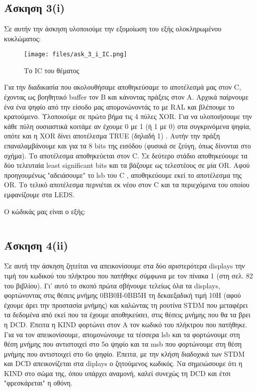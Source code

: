 \documentclass[a4paper,10pt]{article} \usepackage{anysize}
\begin{document}


\section*{} 
\subsection*{Άσκηση 3(i)}
Σε αυτήν την άσκηση υλοποιούμε την εξομοίωση του εξής ολοκληρωμένου
κυκλώματος:
\begin{figure}[h]
\centering
\texttt{[image: files/ask\_3\_i\_IC.png]}
\caption{Το IC του θέματος}
\end{figure}
Για την διαδικασία που ακολουθήσαμε αποθηκεύσαμε το αποτέλεσμά μας στον C,
έχοντας ως βοηθητικό buffer τον B και κάνοντας πράξεις στον Α. Αρχικά
παίρνουμε ένα ένα ψηφίο από την είσοδο μας απομονώνοντάς το με RAL και
βλέπουμε το κρατούμενο. Υλοποιούμε σε πρώτο βήμα τις 4 πύλες XOR. Για να
υλοποιήσουμε την κάθε πύλη ουσιαστικά κοιτάμε αν έχουμε 0 με 1 (ή 1 με 0) στα
συγκρινόμενα ψηφία, οπότε και η XOR δίνει αποτέλεσμα TRUE (δηλαδή 1) . Αυτήν
την πράξη επαναλαμβάνουμε και για τα 8 bits της εισόδου (φυσικά σε ζεύγη, όπως
δίνονται στο σχήμα). Το αποτέλεσμα αποθηκεύεται στον C. Σε δεύτερο στάδιο
αποθηκεύουμε τα δύο τελευταία least significant bits και τα βάζουμε ως
τελεστέους σε μία OR. Αφού προηγουμένως "αδειάσουμε" το lsb του C ,
αποθηκεύουμε εκεί το αποτέλεσμα της OR. Το τελικό αποτέλεσμα περνιέται εκ νέου
στον C και τα περιεχόμενα του οποίου εμφανίζουμε στα LEDS.

Ο κώδικάς μας είναι ο εξής:
\inputminted[linenos,obeytabs,frame=leftline,fontsize=\footnotesize]{oldasm}{files/askhsh_3_i.8085}
\subsection*{Άσκηση 4(ii)}
Σε αυτή την άσκηση ζητείται να απεικονίσουμε στα δύο αριστερότερα displays την
τιμή του κωδικού του πλήκτρου που πατήθηκε σύμφωνα με τον πίνακα 1 (στη σελ.
82 του βιβλίου). Γι' αυτό το σκοπό πρώτα σβήνουμε τελείως όλα τα displays,
φορτώνοντας στις θέσεις μνήμης 0ΒΒ0Η-0ΒΒ5Η τη δεκαεξαδική τιμή 10Η (αφού
έχουμε άρει την προστασία μνήμης) και καλώντας τη ρουτίνα STDM που μεταφέρει
τα δεδομένα από εκεί που τα έχουμε αποθηκεύσει, στις θέσεις μνήμης που θα τα
βρει η DCD. Έπειτα η KIND φορτώνει στον Α τον κωδικό του πλήκτρου που
πατήθηκε. Για να τον απεικονίσουμε, απομονώνουμε τα τέσσερα lsb και τα
φορτώνουμε στη θέση μνήμης που αντιστοιχεί στο 5ο ψηφίο και τα msb που
φορτώνουμε στη θέση μνήμης που αντιστοιχεί στο 6ο ψηφίο. Έπειτα, με την κλήση
διαδοχικά των STDM και DCD απεικονίζεται στα diplays ο ζητούμενος κωδικός. Να
σημειώσουμε ότι η KIND στο σώμα της, όπου υπάρχει αναμονή, καλεί συνεχώς τη
DCD και έτσι "φρεσκάρεται" η οθόνη.
\end{document}

